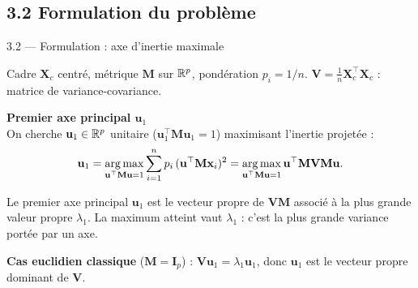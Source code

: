 \subsection{3.2 Formulation du problème}
\begin{frame}{3.2 — Formulation : axe d'inertie maximale}
\begin{block}{Cadre}
$\mathbf{X}_c$ centré, métrique $\mathbf{M}$ sur $\mathbb{R}^p$, pondération $p_i = 1/n$.
$\mathbf{V} = \frac{1}{n}\mathbf{X}_c^\top \mathbf{X}_c$ : matrice de variance-covariance.
\end{block}

\textbf{Premier axe principal $\mathbf{u}_1$}\\
On cherche $\mathbf{u}_1 \in \mathbb{R}^p$ unitaire ($\mathbf{u}_1^\top \mathbf{M} \mathbf{u}_1 = 1$)
maximisant l'inertie projetée :
\[
\mathbf{u}_1 = \operatorname*{arg\,max}_{\mathbf{u}^\top \mathbf{M} \mathbf{u} = 1}
\sum_{i=1}^n p_i \, (\mathbf{u}^\top \mathbf{M} \mathbf{x}_i)^2
= \operatorname*{arg\,max}_{\mathbf{u}^\top \mathbf{M} \mathbf{u} = 1} \mathbf{u}^\top \mathbf{M} \mathbf{V} \mathbf{M} \mathbf{u}.
\]

\begin{theorem}[Solution]
Le premier axe principal $\mathbf{u}_1$ est le vecteur propre de
$\mathbf{V}\mathbf{M}$ associé à la plus grande valeur propre $\lambda_1$.
La maximum atteint vaut $\lambda_1$ : c'est la \alert{plus grande variance} portée par un axe.
\end{theorem}

\textbf{Cas euclidien classique} ($\mathbf{M} = \mathbf{I}_p$) :
$\mathbf{V}\mathbf{u}_1 = \lambda_1 \mathbf{u}_1$, donc $\mathbf{u}_1$ est
le vecteur propre dominant de $\mathbf{V}$.
\end{frame}

